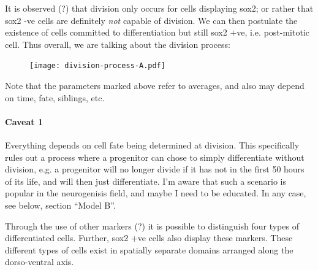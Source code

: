 \documentclass[10pt,english]{article}
\begin{document}
It is observed (?) that division only occurs for cells displaying sox2; or
rather that sox2 -ve cells are definitely \emph{not} capable of division. We can 
then postulate the existence of cells committed to differentiation but still
sox2 +ve, i.e. post-mitotic cell. Thus overall, we are talking about the 
division process:

\begin{figure}[h]
	\begin{center}
		\texttt{[image: division-process-A.pdf]}
	\end{center}
\end{figure}

Note that the parameters marked above refer to averages, and also may depend
on time, fate, siblings, etc.

\paragraph{Caveat 1}

Everything depends on cell fate being determined at division. This specifically
rules out a process where a progenitor can chose to simply differentiate without
division, e.g. a progenitor will no longer divide if it has not in the first 50
hours of its life, and will then just differentiate. I'm aware that such a
scenario is popular in the neurogenisis field, and maybe I need to be educated.
In any case, see below, section ``Model B''.

Through the use of other markers (?) it is possible to distinguish four types
of differentiated cells. Further, sox2 +ve cells also display these markers.
These different types of cells exist in spatially separate domains arranged
along the dorso-ventral axis.
\end{document}

